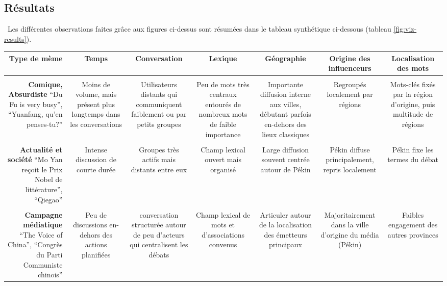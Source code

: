 \subsection[Résumé des résultats]{Résultats}
\
Les différentes observations faites grâce aux figures ci-dessus sont résumées dans le tableau synthétique ci-dessous (tableau \ref{fig:viz-results}).

\begin{table}[h!]
    \begin{minipage}{20.5cm}
    \begin{turn}{90}
    \begin{tabulary}{\linewidth}{ R | C C C C C C}

        \textbf{Type de mème} & 
        \textbf{Temps} &  
        \textbf{Conversation} &  
        \textbf{Lexique} &
        \textbf{Géographie} &
        \textbf{Origine des influenceurs} &
        \textbf{Localisation des mots} \\

        \hline \\[-1.2ex]
        \textbf{Comique, Absurdiste} \newline
        \small{ ``Du Fu is very busy'', ``Yuanfang, qu'en penses-tu?'' } &
        Moins de volume, mais présent  plus longtemps dans les conversations &
        Utilisateurs distants qui communiquent faiblement ou par petits groupes &
        Peu de mots très centraux entourés de nombreux mots de faible importance &
        Importante diffusion interne aux villes, débutant parfois en-dehors des lieux classiques &
        Regroupés localement par régions & 
        Mots-clés fixés par la région d'origine, puis multitude de régions \\
        \hline \\[-1.2ex]
        \textbf{Actualité et société}  \newline
        \small{``Mo Yan reçoit le Prix Nobel de littérature'', ``Qiegao''}&
        Intense discussion de courte durée &
        Groupes très actifs mais distants entre eux  &
        Champ lexical ouvert mais organisé &
        Large diffusion souvent centrée autour de Pékin &
        Pékin diffuse principalement, repris localement  &
        Pékin fixe les termes du débat \\

        \hline \\[-1.2ex]
        \textbf{Campagne médiatique} \newline
        \small{``The Voice of China'', ``Congrès du Parti Communiste chinois''} &
        Peu de discussions en-dehors des actions planifiées &
        conversation structurée autour de peu d{\textquoteright}acteurs qui centralisent les débats &
        Champ lexical de mots et d'associations convenus  &
        Articuler autour de la localisation des émetteurs principaux &
        Majoritairement dans la ville d'origine du média (Pékin) &
        Faibles engagement des autres provinces \\


\end{tabulary}
\end{turn}
\end{minipage}
\end{table}
